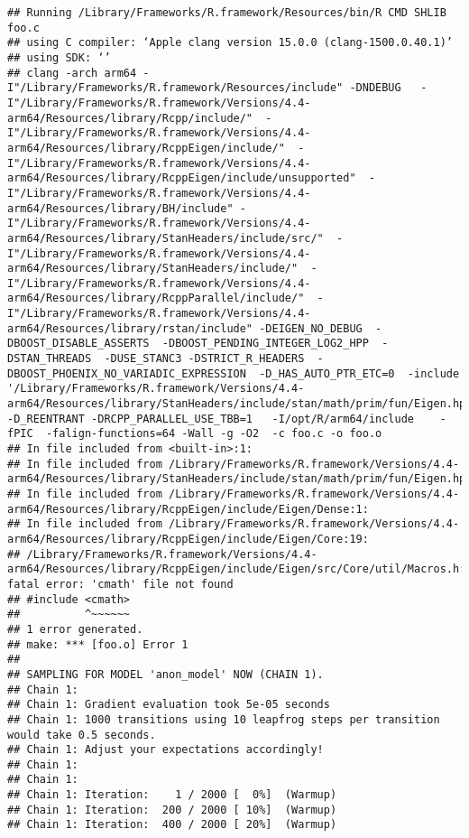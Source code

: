 \documentclass[
]{article}
\begin{document}
\begin{verbatim}
## Running /Library/Frameworks/R.framework/Resources/bin/R CMD SHLIB foo.c
## using C compiler: ‘Apple clang version 15.0.0 (clang-1500.0.40.1)’
## using SDK: ‘’
## clang -arch arm64 -I"/Library/Frameworks/R.framework/Resources/include" -DNDEBUG   -I"/Library/Frameworks/R.framework/Versions/4.4-arm64/Resources/library/Rcpp/include/"  -I"/Library/Frameworks/R.framework/Versions/4.4-arm64/Resources/library/RcppEigen/include/"  -I"/Library/Frameworks/R.framework/Versions/4.4-arm64/Resources/library/RcppEigen/include/unsupported"  -I"/Library/Frameworks/R.framework/Versions/4.4-arm64/Resources/library/BH/include" -I"/Library/Frameworks/R.framework/Versions/4.4-arm64/Resources/library/StanHeaders/include/src/"  -I"/Library/Frameworks/R.framework/Versions/4.4-arm64/Resources/library/StanHeaders/include/"  -I"/Library/Frameworks/R.framework/Versions/4.4-arm64/Resources/library/RcppParallel/include/"  -I"/Library/Frameworks/R.framework/Versions/4.4-arm64/Resources/library/rstan/include" -DEIGEN_NO_DEBUG  -DBOOST_DISABLE_ASSERTS  -DBOOST_PENDING_INTEGER_LOG2_HPP  -DSTAN_THREADS  -DUSE_STANC3 -DSTRICT_R_HEADERS  -DBOOST_PHOENIX_NO_VARIADIC_EXPRESSION  -D_HAS_AUTO_PTR_ETC=0  -include '/Library/Frameworks/R.framework/Versions/4.4-arm64/Resources/library/StanHeaders/include/stan/math/prim/fun/Eigen.hpp'  -D_REENTRANT -DRCPP_PARALLEL_USE_TBB=1   -I/opt/R/arm64/include    -fPIC  -falign-functions=64 -Wall -g -O2  -c foo.c -o foo.o
## In file included from <built-in>:1:
## In file included from /Library/Frameworks/R.framework/Versions/4.4-arm64/Resources/library/StanHeaders/include/stan/math/prim/fun/Eigen.hpp:22:
## In file included from /Library/Frameworks/R.framework/Versions/4.4-arm64/Resources/library/RcppEigen/include/Eigen/Dense:1:
## In file included from /Library/Frameworks/R.framework/Versions/4.4-arm64/Resources/library/RcppEigen/include/Eigen/Core:19:
## /Library/Frameworks/R.framework/Versions/4.4-arm64/Resources/library/RcppEigen/include/Eigen/src/Core/util/Macros.h:679:10: fatal error: 'cmath' file not found
## #include <cmath>
##          ^~~~~~~
## 1 error generated.
## make: *** [foo.o] Error 1
## 
## SAMPLING FOR MODEL 'anon_model' NOW (CHAIN 1).
## Chain 1: 
## Chain 1: Gradient evaluation took 5e-05 seconds
## Chain 1: 1000 transitions using 10 leapfrog steps per transition would take 0.5 seconds.
## Chain 1: Adjust your expectations accordingly!
## Chain 1: 
## Chain 1: 
## Chain 1: Iteration:    1 / 2000 [  0%]  (Warmup)
## Chain 1: Iteration:  200 / 2000 [ 10%]  (Warmup)
## Chain 1: Iteration:  400 / 2000 [ 20%]  (Warmup)

\end{verbatim}
\end{document}
